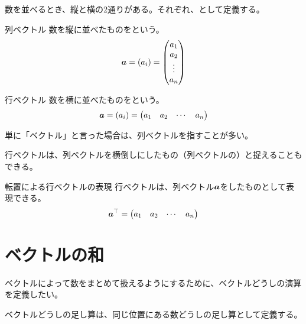 \documentclass[../../../topic_linear-algebra]{subfiles}
\begin{document}
\br

数を並べるとき、縦と横の2通りがある。それぞれ、として定義する。

\begin{definition*}{列ベクトル}
  数を縦に並べたものをという。
  \begin{equation*}
    \vb*{a} = (a_i) = \begin{pmatrix} a_1 \\ a_2 \\ \vdots \\ a_n \end{pmatrix}
  \end{equation*}
\end{definition*}

\begin{definition*}{行ベクトル}
  数を横に並べたものをという。
  \begin{equation*}
    \vb*{a} = (a_i) = \begin{pmatrix} a_1 & a_2 & \cdots & a_n \end{pmatrix}
  \end{equation*}
\end{definition*}

単に「ベクトル」と言った場合は、列ベクトルを指すことが多い。

\br

行ベクトルは、列ベクトルを横倒しにしたもの（列ベクトルの）と捉えることもできる。

\begin{theorem*}{転置による行ベクトルの表現}
  行ベクトルは、列ベクトル$\vb*{a}$をしたものとして表現できる。
  \begin{equation*}
    \vb*{a}^\top = \begin{pmatrix} a_1 & a_2 & \cdots & a_n \end{pmatrix}
  \end{equation*}
\end{theorem*}

\sectionline
\section{ベクトルの和}

ベクトルによって数をまとめて扱えるようにするために、ベクトルどうしの演算を定義したい。

\br

ベクトルどうしの足し算は、同じ位置にある数どうしの足し算として定義する。
\end{document}
